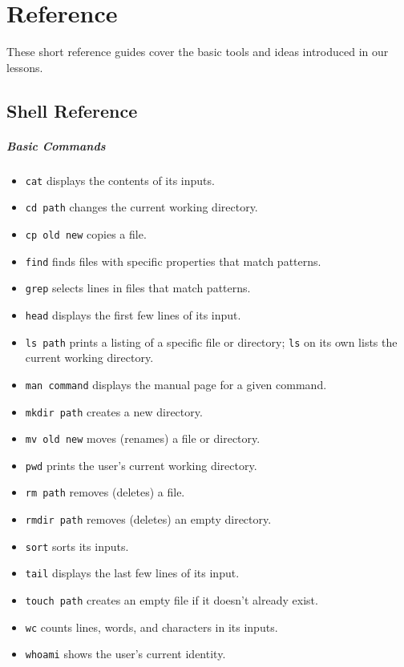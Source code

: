 \documentclass[]{book}
\begin{document}
\chapter{Reference}\label{reference}

These short reference guides cover the basic tools and ideas introduced
in our lessons.

\section{Shell Reference}

\mbox{}\paragraph{Basic Commands}

\begin{itemize}
\item
  \texttt{cat} displays the contents of its inputs.
\item
  \texttt{cd path} changes the current working directory.
\item
  \texttt{cp old new} copies a file.
\item
  \texttt{find} finds files with specific properties that match
  patterns.
\item
  \texttt{grep} selects lines in files that match patterns.
\item
  \texttt{head} displays the first few lines of its input.
\item
  \texttt{ls path} prints a listing of a specific file or directory;
  \texttt{ls} on its own lists the current working directory.
\item
  \texttt{man command} displays the manual page for a given command.
\item
  \texttt{mkdir path} creates a new directory.
\item
  \texttt{mv old new} moves (renames) a file or directory.
\item
  \texttt{pwd} prints the user's current working directory.
\item
  \texttt{rm path} removes (deletes) a file.
\item
  \texttt{rmdir path} removes (deletes) an empty directory.
\item
  \texttt{sort} sorts its inputs.
\item
  \texttt{tail} displays the last few lines of its input.
\item
  \texttt{touch path} creates an empty file if it doesn't already exist.
\item
  \texttt{wc} counts lines, words, and characters in its inputs.
\item
  \texttt{whoami} shows the user's current identity.
\end{itemize}
\end{document}
